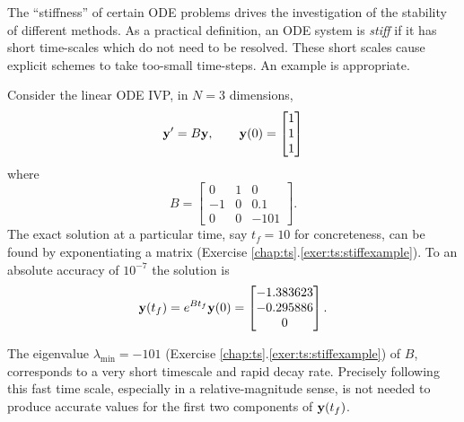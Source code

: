The ``stiffness'' of certain ODE problems drives the investigation of the stability of different methods.  As a practical definition, an ODE system is \emph{stiff} if it has short time-scales which do not need to be resolved.  These short scales cause explicit schemes to take too-small time-steps.  An example is appropriate.

\noindent\hrulefill
\begin{example}  \label{ex:ts:odestiff}  Consider the linear ODE IVP, in $N=3$ dimensions,
\begin{equation}
   \mathbf{y}' = B \mathbf{y}, \qquad \mathbf{y}(0) = \begin{bmatrix} 1 \\ 1 \\ 1 \end{bmatrix} \label{eq:ts:stiffexample}
\end{equation}
where
\begin{equation}
   B = \begin{bmatrix} 0 & 1 & 0 \\
                      -1 & 0 & 0.1 \\
                       0 & 0 & -101 \end{bmatrix}. \label{eq:ts:stiffexamplematrix}
\end{equation}
The exact solution at a particular time, say $t_f=10$ for concreteness, can be found by exponentiating a matrix (Exercise \ref{chap:ts}.\ref{exer:ts:stiffexample}).  To an absolute accuracy of $10^{-7}$ the solution is
\begin{equation}
    \mathbf{y}(t_f) = e^{B t_f} \mathbf{y}(0) = \begin{bmatrix} -1.383623 \\
                                                 -0.295886 \\
                                                  0 \end{bmatrix}.\label{eq:ts:stiffsoln}
\end{equation}

The eigenvalue $\lambda_{\min}=-101$ (Exercise \ref{chap:ts}.\ref{exer:ts:stiffexample}) of $B$, corresponds to a very short timescale and rapid decay rate.  Precisely following this fast time scale, especially in a relative-magnitude sense, is not needed to produce accurate values for the first two components of $\mathbf{y}(t_f)$.


\end{example}
